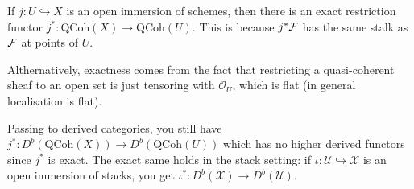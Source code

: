 \documentclass[12pt]{article}
\begin{document}
\begin{remark}
  If $j: U \hookrightarrow X$ is an open immersion of schemes, then there is an exact restriction functor $j^*: \mathrm{QCoh}(X) \to \mathrm{QCoh}(U)$. This is because $j^*{\mathcal{F}}$ has the same stalk as ${\mathcal{F}}$ at points of $U$.

  Althernatively, exactness comes from the fact that restricting a quasi-coherent sheaf to an open set is just tensoring with $\mathcal{O}_U$, which is flat (in general localisation is flat).

  Passing to derived categories, you still have $j^*: D^b(\mathrm{QCoh}(X)) \to D^b(\mathrm{QCoh}(U))$ which has no higher derived functors since $j^*$ is exact. The exact same holds in the stack setting: if $\iota: \mathcal{U} \hookrightarrow \mathcal{X}$ is an open immersion of stacks, you get $\iota^*: D^b(\mathcal{X}) \to D^b(\mathcal{U})$.
\end{remark}
\end{document}
